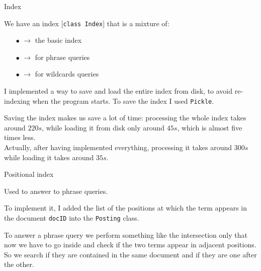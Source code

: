 \documentclass[10pt, aspectratio=169, compress, protectframetitle, handout]{beamer}
\begin{document}
\begin{frame}{Index}

    We have an index [\texttt{\alert{class Index}}] that is a mixture of:
        \begin{itemize}
            \item[\alert{$\bullet$}] { $\longrightarrow$ \quad the basic index}
            \item[\alert{$\bullet$}] { $\longrightarrow$ \quad for phrase queries}
            \item[\alert{$\bullet$}] { $\longrightarrow$ \quad for wildcards queries}
        \end{itemize}
        
    \medskip
        
    
    I implemented a way to save and load the entire index from disk, to avoid re-indexing when the program starts. To save the index I used \texttt{Pickle}.
    
    \alert{Saving the index} makes us save a lot of time: processing the whole index takes around $220s$, while loading it from disk only around $45s$, which is almost five times less.\\
    Actually, after having implemented everything, processing it takes around $300s$ while loading it takes around $35s$.\\

\end{frame}



    

\begin{frame}{Positional index}

    Used to answer to \alert{phrase queries}.

    To implement it, I added the list of the positions at which the term appears in the document \texttt{docID} into the \texttt{Posting} class.
    
    To answer a phrase query we perform something like the intersection only that now we have to go inside and check if the two terms appear in adjacent positions. So we search if they are contained in the same document and if they are one after the other.
    

\end{frame}
\end{document}
